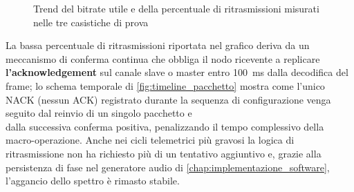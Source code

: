 \begin{figure}[H]
    \centering
    \caption{Trend del bitrate utile e della percentuale di ritrasmissioni misurati nelle tre casistiche di prova}
    \label{fig:trend_bitrate}
\end{figure}

La bassa percentuale di ritrasmissioni riportata nel grafico deriva da un meccanismo di conferma
 continua che obbliga il nodo ricevente a replicare \textbf{l'acknowledgement} sul canale slave o master entro \SI{100}{\milli\second} dalla decodifica del frame;
  lo schema temporale di \autoref{fig:timeline_pacchetto} 
  mostra come l'unico NACK (nessun ACK) registrato durante la sequenza di configurazione venga seguito dal reinvio di un singolo pacchetto e \\
  dalla successiva conferma positiva, penalizzando il tempo complessivo della macro-operazione.
  \newpage
   Anche nei cicli telemetrici più gravosi la logica di ritrasmissione non ha richiesto più di un tentativo aggiuntivo e,
    grazie alla persistenza di fase nel generatore audio di \autoref{chap:implementazione_software}, 
    l'aggancio dello spettro è rimasto stabile.

